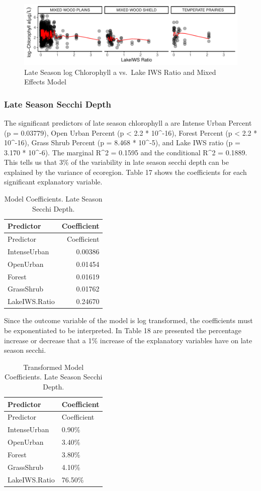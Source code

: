 \documentclass[12pt,]{article}
\begin{document}
\begin{figure}
\centering
\includegraphics{Bollt_Greif_Raby_Roth_Project_Final_files/figure-latex/unnamed-chunk-31-1.pdf}
\caption{Late Season log Chlorophyll a vs.~Lake IWS Ratio and Mixed
Effects Model}
\end{figure}

\hypertarget{late-season-secchi-depth}{%
\subsubsection{Late Season Secchi
Depth}\label{late-season-secchi-depth}}

The significant predictors of late season chlorophyll a are Intense
Urban Percent (p = 0.03779), Open Urban Percent (p \textless{} 2.2 *
10\^{}-16), Forest Percent (p \textless{} 2.2 * 10\^{}-16), Grass Shrub
Percent (p = 8.468 * 10\^{}-5), and Lake IWS ratio (p = 3.170 *
10\^{}-6). The marginal R\^{}2 = 0.1595 and the conditional R\^{}2 =
0.1889. This tells us that 3\% of the variability in late season secchi
depth can be explained by the variance of ecoregion. Table 17 shows the
coefficients for each significant explanatory variable.

\newpage

\begin{longtable}[]{@{}lr@{}}
\caption{Model Coefficients. Late Season Secchi Depth.}\tabularnewline
\toprule
Predictor & Coefficient\tabularnewline
\midrule
\endfirsthead
\toprule
Predictor & Coefficient\tabularnewline
\midrule
\endhead
IntenseUrban & 0.00386\tabularnewline
OpenUrban & 0.01454\tabularnewline
Forest & 0.01619\tabularnewline
GrassShrub & 0.01762\tabularnewline
LakeIWS.Ratio & 0.24670\tabularnewline
\bottomrule
\end{longtable}

Since the outcome variable of the model is log transformed, the
coefficients must be exponentiated to be interpreted. In Table 18 are
presented the percentage increase or decrease that a 1\% increase of the
explanatory variables have on late season secchi.

\begin{longtable}[]{@{}ll@{}}
\caption{Transformed Model Coefficients. Late Season Secchi
Depth.}\tabularnewline
\toprule
Predictor & Coefficient\tabularnewline
\midrule
\endfirsthead
\toprule
Predictor & Coefficient\tabularnewline
\midrule
\endhead
IntenseUrban & 0.90\%\tabularnewline
OpenUrban & 3.40\%\tabularnewline
Forest & 3.80\%\tabularnewline
GrassShrub & 4.10\%\tabularnewline
LakeIWS.Ratio & 76.50\%\tabularnewline
\bottomrule
\end{longtable}
\end{document}
